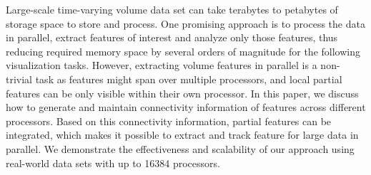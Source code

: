 Large-scale time-varying volume data set can take terabytes to petabytes of storage space to store and process. One promising approach is to process the data in parallel, extract features of interest and analyze only those features, thus reducing required memory space by several orders of magnitude for the following visualization tasks. However, extracting volume features in parallel is a non-trivial task as features might span over multiple processors, and local partial features can be only visible within their own processor. In this paper, we discuss how to generate and maintain connectivity information of features across different processors. Based on this connectivity information, partial features can be integrated, which makes it possible to extract and track feature for large data in parallel. We demonstrate the effectiveness and scalability of our approach using real-world data sets with up to 16384 processors.